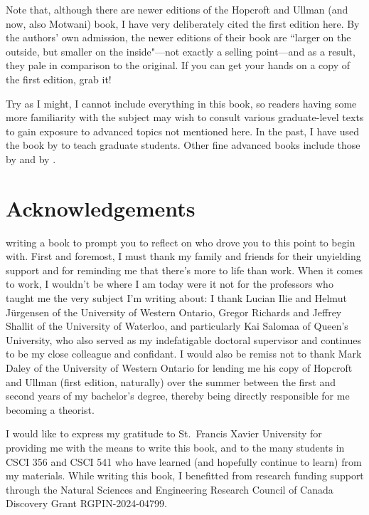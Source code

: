 Note that, although there are newer editions of the Hopcroft and Ullman (and now, also Motwani) book, I have very deliberately cited the first edition here. By the authors' own admission, the newer editions of their book are ``larger on the outside, but smaller on the inside"---not exactly a selling point---and as a result, they pale in comparison to the original. If you can get your hands on a copy of the first edition, grab it!

Try as I might, I cannot include everything in this book, so readers having some more familiarity with the subject may wish to consult various graduate-level texts to gain exposure to advanced topics not mentioned here. In the past, I have used the book by \citet{AroraBarak2009ComputationalComplexity} to teach graduate students. Other fine advanced books include those by \citet{Kozen2006TheoryOfComputation} and by \citet{Papadimitriou1994ComputationalComplexity}.

\section*{Acknowledgements}

 writing a book to prompt you to reflect on who drove you to this point to begin with. First and foremost, I must thank my family and friends for their unyielding support and for reminding me that there's more to life than work. When it comes to work, I wouldn't be where I am today were it not for the professors who taught me the very subject I'm writing about: I thank Lucian Ilie and Helmut J\"{u}rgensen of the University of Western Ontario, Gregor Richards and Jeffrey Shallit of the University of Waterloo, and particularly Kai Salomaa of Queen's University, who also served as my indefatigable doctoral supervisor and continues to be my close colleague and confidant. I would also be remiss not to thank Mark Daley of the University of Western Ontario for lending me his copy of Hopcroft and Ullman (first edition, naturally) over the summer between the first and second years of my bachelor's degree, thereby being directly responsible for me becoming a theorist.

I would like to express my gratitude to St.\ Francis Xavier University for providing me with the means to write this book, and to the many students in CSCI 356 and CSCI 541 who have learned (and hopefully continue to learn) from my materials. While writing this book, I benefitted from research funding support through the Natural Sciences and Engineering Research Council of Canada Discovery Grant RGPIN-2024-04799.


